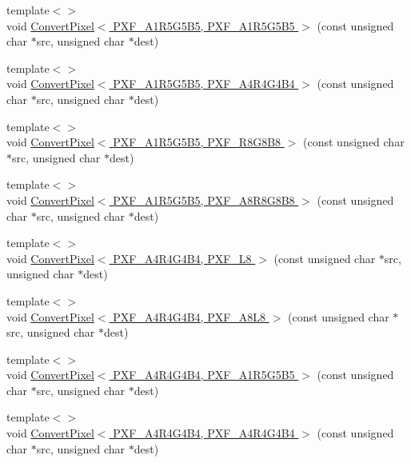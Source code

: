 \begin{DoxyCompactItemize}
{\footnotesize template$<$$>$ }\\void \hyperlink{_convert_pixel_8inl_a59936e71230ee86a43d738e59b520277}{Convert\+Pixel$<$ P\+X\+F\+\_\+\+A1\+R5\+G5\+B5, P\+X\+F\+\_\+\+A1\+R5\+G5\+B5 $>$} (const unsigned char $\ast$src, unsigned char $\ast$dest)
\item 
{\footnotesize template$<$$>$ }\\void \hyperlink{_convert_pixel_8inl_abd2bd032fb975d5e3a51cd13612aa8e6}{Convert\+Pixel$<$ P\+X\+F\+\_\+\+A1\+R5\+G5\+B5, P\+X\+F\+\_\+\+A4\+R4\+G4\+B4 $>$} (const unsigned char $\ast$src, unsigned char $\ast$dest)
\item 
{\footnotesize template$<$$>$ }\\void \hyperlink{_convert_pixel_8inl_a5c4547c1faafe2691ed947d5c4f4bf38}{Convert\+Pixel$<$ P\+X\+F\+\_\+\+A1\+R5\+G5\+B5, P\+X\+F\+\_\+\+R8\+G8\+B8 $>$} (const unsigned char $\ast$src, unsigned char $\ast$dest)
\item 
{\footnotesize template$<$$>$ }\\void \hyperlink{_convert_pixel_8inl_a571b40fd33b03ebefc3e6432b9e435ff}{Convert\+Pixel$<$ P\+X\+F\+\_\+\+A1\+R5\+G5\+B5, P\+X\+F\+\_\+\+A8\+R8\+G8\+B8 $>$} (const unsigned char $\ast$src, unsigned char $\ast$dest)
\item 
{\footnotesize template$<$$>$ }\\void \hyperlink{_convert_pixel_8inl_a44b781519b77cfc50703ab162b9e1f77}{Convert\+Pixel$<$ P\+X\+F\+\_\+\+A4\+R4\+G4\+B4, P\+X\+F\+\_\+\+L8 $>$} (const unsigned char $\ast$src, unsigned char $\ast$dest)
\item 
{\footnotesize template$<$$>$ }\\void \hyperlink{_convert_pixel_8inl_a9ffbf19ed80a8f7498b98fb9a7f46f56}{Convert\+Pixel$<$ P\+X\+F\+\_\+\+A4\+R4\+G4\+B4, P\+X\+F\+\_\+\+A8\+L8 $>$} (const unsigned char $\ast$src, unsigned char $\ast$dest)
\item 
{\footnotesize template$<$$>$ }\\void \hyperlink{_convert_pixel_8inl_ac404510aeb7adc7e52faad3b5c4c76fc}{Convert\+Pixel$<$ P\+X\+F\+\_\+\+A4\+R4\+G4\+B4, P\+X\+F\+\_\+\+A1\+R5\+G5\+B5 $>$} (const unsigned char $\ast$src, unsigned char $\ast$dest)
\item 
{\footnotesize template$<$$>$ }\\void \hyperlink{_convert_pixel_8inl_ad80f32e7ed62147a40e08a77c3bb02e4}{Convert\+Pixel$<$ P\+X\+F\+\_\+\+A4\+R4\+G4\+B4, P\+X\+F\+\_\+\+A4\+R4\+G4\+B4 $>$} (const unsigned char $\ast$src, unsigned char $\ast$dest)
\item 

\end{DoxyCompactItemize}

